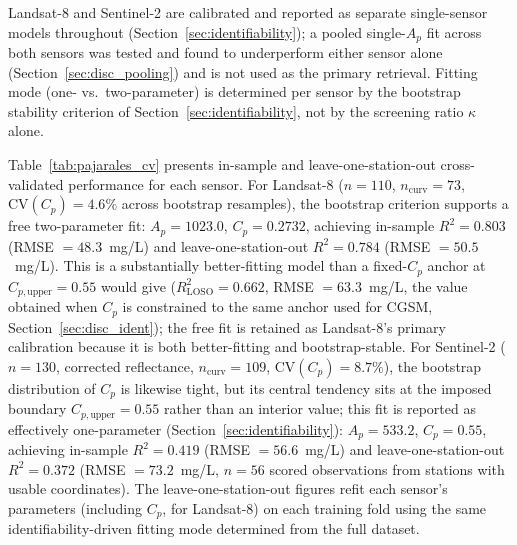 \documentclass[remotesensing,article,submit,pdftex,moreauthors]{Definitions/mdpi}
\begin{document}
Landsat-8 and Sentinel-2 are calibrated and reported as separate
single-sensor models throughout (Section~\ref{sec:identifiability}); a
pooled single-$A_p$ fit across both sensors was tested and found to
underperform either sensor alone (Section~\ref{sec:disc_pooling}) and
is not used as the primary retrieval. Fitting mode (one- vs.\
two-parameter) is determined per sensor by the bootstrap stability
criterion of Section~\ref{sec:identifiability}, not by the screening
ratio $\kappa$ alone.
 
Table~\ref{tab:pajarales_cv} presents in-sample and leave-one-station-out
cross-validated performance for each sensor. For Landsat-8 ($n=110$,
$n_{\text{curv}}=73$, $\mathrm{CV}(C_p)=4.6\%$ across bootstrap
resamples), the bootstrap criterion supports a free two-parameter fit:
$A_p = 1023.0$, $C_p = 0.2732$, achieving in-sample $R^2 = 0.803$
(RMSE $= 48.3$~mg/L) and leave-one-station-out $R^2 = 0.784$
(RMSE $= 50.5$~mg/L). This is a substantially better-fitting model than
a fixed-$C_p$ anchor at $C_{p,\text{upper}}=0.55$ would give
($R^2_{\text{LOSO}} = 0.662$, RMSE $= 63.3$~mg/L, the value obtained
when $C_p$ is constrained to the same anchor used for CGSM,
Section~\ref{sec:disc_ident}); the free fit is retained as Landsat-8's
primary calibration because it is both better-fitting and bootstrap-stable.
For Sentinel-2 ($n=130$, corrected reflectance, $n_{\text{curv}}=109$,
$\mathrm{CV}(C_p)=8.7\%$), the bootstrap distribution of $C_p$ is
likewise tight, but its central tendency sits at the imposed boundary
$C_{p,\text{upper}}=0.55$ rather than an interior value; this fit is
reported as effectively one-parameter
(Section~\ref{sec:identifiability}): $A_p = 533.2$, $C_p = 0.55$,
achieving in-sample $R^2 = 0.419$ (RMSE $= 56.6$~mg/L) and
leave-one-station-out $R^2 = 0.372$ (RMSE $= 73.2$~mg/L, $n=56$ scored
observations from stations with usable coordinates). The
leave-one-station-out figures refit each sensor's parameters
(including $C_p$, for Landsat-8) on each training fold using the same
identifiability-driven fitting mode determined from the full dataset.
 
\end{document}
